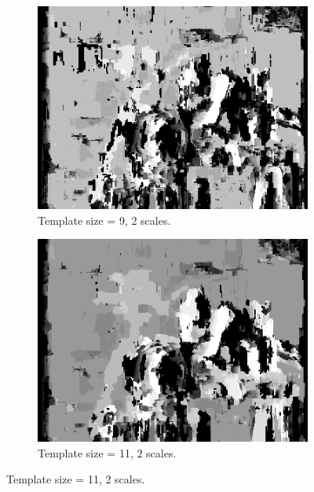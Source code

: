 \documentclass[12pt,a4paper,oneside,final]{article}
\begin{document}
\begin{figure}[H]
\begin{subfigure}[b]{0.24\textwidth}
	\includegraphics[width=\textwidth]{disparity_s2_k9set_1.png}
	\caption{Template size = 9, 2 scales.}
\end{subfigure}
\begin{subfigure}[b]{0.24\textwidth}
	\includegraphics[width=\textwidth]{disparity_s2_k11set_1.png}
	\caption{Template size = 11, 2 scales.}
\end{subfigure}
\end{figure}
\end{document}
